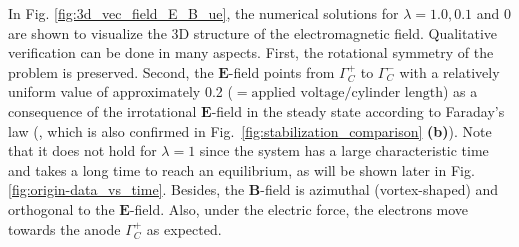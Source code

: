 \documentclass{article}
\begin{document}
In Fig. \ref{fig:3d_vec_field_E_B_ue}, the numerical solutions for $\lambda = 1.0, 0.1$
and $0$ are shown to visualize the 3D structure of the electromagnetic field. Qualitative
verification can be done in many aspects. First, the rotational symmetry of the problem is
preserved. Second, the $\mathbf{E}$-field points from $\Gamma^+_C$ to $\Gamma^-_C$ with a
relatively uniform value of approximately 0.2
($=\text{applied voltage}/\text{cylinder length}$) as a consequence of the irrotational
$\mathbf{E}$-field in the steady state according to Faraday's law (, which is also confirmed
in Fig.~\ref{fig:stabilization_comparison} \textbf{(b)}). Note that it does not hold for $\lambda = 1$
since the system has a large characteristic time and takes a long time to reach an
equilibrium, as will be shown later in Fig. \ref{fig:origin-data_vs_time}. Besides, the
$\mathbf{B}$-field is azimuthal (vortex-shaped) and orthogonal to the
$\mathbf{E}$-field. Also, under the electric force, the electrons move towards the anode
$\Gamma^+_C$ as expected.
\end{document}
